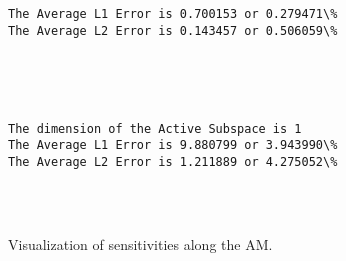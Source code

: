 \documentclass[11pt]{article}
\begin{document}
    \begin{Verbatim}[commandchars=\\\{\}]
The Average L1 Error is 0.700153 or 0.279471\%
The Average L2 Error is 0.143457 or 0.506059\%

    \end{Verbatim}

    \begin{center}
    \end{center}
    { \hspace*{\fill} \\}
    
    \begin{center}
    \end{center}
    { \hspace*{\fill} \\}
    
    \begin{Verbatim}[commandchars=\\\{\}]
The dimension of the Active Subspace is 1
The Average L1 Error is 9.880799 or 3.943990\%
The Average L2 Error is 1.211889 or 4.275052\%


    \end{Verbatim}

    \begin{center}
    \end{center}
    { \hspace*{\fill} \\}
    
    Visualization of sensitivities along the AM.
\end{document}
